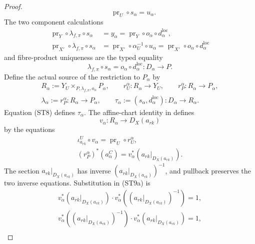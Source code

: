 \begin{proof}
\[    \quad
    \operatorname{pr}_U\circ s_\alpha=u_\alpha.               \tag{ST7}
  \]
  The two component calculations
  \[
  \begin{aligned}
    \operatorname{pr}_Y\circ\lambda_{f,\pi}\circ s_\alpha
      &=y_\alpha
       =\operatorname{pr}_Y\circ o_\alpha\circ d^{\mathrm{loc}}_\alpha,\\
    \operatorname{pr}_{X'}\circ\lambda_{f,\pi}\circ s_\alpha
      &=\operatorname{pr}_{X'}\circ\alpha_U^{-1}\circ u_\alpha
       =\operatorname{pr}_{X'}\circ o_\alpha\circ
          d^{\mathrm{loc}}_\alpha
  \end{aligned}
  \]
  and fibre-product uniqueness are the typed equality
  \[
    \lambda_{f,\pi}\circ s_\alpha
      =o_\alpha\circ d^{\mathrm{loc}}_\alpha
      \colon D_\alpha\to P.                                    \tag{ST8}
  \]
  Define the actual source of the restriction to $P_\alpha$ by
  \[
  \begin{gathered}
    R_\alpha:=Y_U\times_{P,\lambda_{f,\pi},o_\alpha}P_\alpha,
    \qquad
    r_U^\alpha\colon R_\alpha\to Y_U,
    \qquad
    r_P^\alpha\colon R_\alpha\to P_\alpha,\\
    \lambda_\alpha:=r_P^\alpha\colon R_\alpha\to P_\alpha,
    \qquad
    \tau_\alpha:=(s_\alpha,d^{\mathrm{loc}}_\alpha)
      \colon D_\alpha\longrightarrow R_\alpha.
  \end{gathered}                                                  \tag{ST9}
  \]
  Equation (ST8) defines $\tau_\alpha$.  The affine-chart identity in
  defines
  \[
    v_\alpha\colon R_\alpha\longrightarrow D_X(a_{rk})
  \]
  by the equations
  \[
  \begin{gathered}
    \iota_{a_{rk}}^U\circ v_\alpha
      =\operatorname{pr}_U\circ r_U^\alpha,\\
    (r_P^\alpha)^*(a^C_\alpha)
      =v_\alpha^*(a_{rk}|_{D_X(a_{rk})}).
  \end{gathered}                                                   \tag{ST9a}
  \]
  The section $a_{rk}|_{D_X(a_{rk})}$ has inverse
  $(a_{rk}|_{D_X(a_{rk})})^{-1}$, and pullback preserves the two inverse
  equations.  Substitution in (ST9a) is
  \[
  \begin{gathered}
    v_\alpha^*(a_{rk}|_{D_X(a_{rk})})
      \cdot v_\alpha^*((a_{rk}|_{D_X(a_{rk})})^{-1})=1,\\
    v_\alpha^*((a_{rk}|_{D_X(a_{rk})})^{-1})
      \cdot v_\alpha^*(a_{rk}|_{D_X(a_{rk})})=1,\\

\end{gathered}\]
\end{proof}
